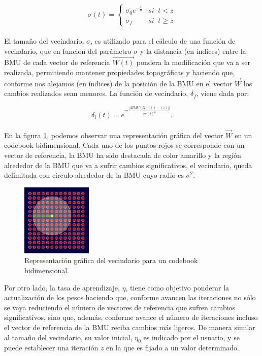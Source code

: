 $$\sigma(t) = \left\{
\begin{array}{ll}
\sigma_0e^{-\frac{t}{\tau}} & si \;\;t < z\\
\sigma_f & si  \;\; t\geq z
\end{array}
\right.
$$\\



El tamaño del vecindario, $\sigma$, es utilizado para el cálculo de una función de vecindario, que en función del parámetro $\sigma$ y la distancia (en índices) entre la BMU de cada vector de referencia $\vec{W(t)}$ pondera la modificación que va a ser realizada, permitiendo mantener propiedades topográficas y haciendo que, conforme nos alejamos (en índices) de la posición de la BMU en el vector $\vec{W}$ los cambios realizados sean menores. La función de vecindario, $\delta_f$, viene dada por:

$$\delta_i(t) = e ^{-\frac{||BMU(X(t))-(i)||}{2\sigma(t)^2}}. $$\\	


En la figura \ref{img:vecindario}, podemos observar una representación gráfica del vector $\vec{W}$ en un codebook bidimensional. Cada uno de los puntos rojos se corresponde con un vector de referencia, la BMU ha sido destacada de color amarillo y la región alrededor de la BMU que va a sufrir cambios significativos, el vecindario, queda delimitada con círculo alrededor de la BMU cuyo radio es $\sigma^2$.
\begin{figure}[H]
\centering
\includegraphics[width=0.3\textwidth]{imagenes/vecindario.png}

\caption{Representación gráfica del vecindario para un codebook bidimensional.}
\label{img:vecindario}
\end{figure}


Por otro lado, la tasa de aprendizaje, $\eta$, tiene como objetivo ponderar la actualización de los pesos haciendo que, conforme avancen las iteraciones no sólo se vaya reduciendo el número de vectores de referencia que sufren cambios significativos, sino que, además, conforme avance el número de iteraciones incluso el vector de referencia de la BMU reciba cambios más ligeros. De manera similar al tamaño del vecindario, su valor inicial, $\eta_0$ es indicado por el usuario, y se puede establecer una iteración $z$ en la que es fijado a un valor determinado.

